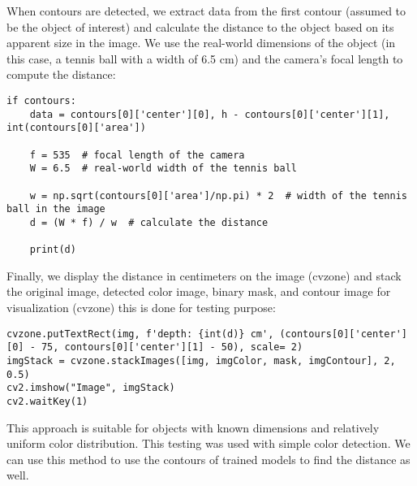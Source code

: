 When contours are detected, we extract data from the first contour (assumed to be the object of interest) and calculate the distance to the object based on its apparent size in the image. We use the real-world dimensions of the object (in this case, a tennis ball with a width of 6.5 cm) and the camera's focal length to compute the distance:

\begin{lstlisting}[language=PythonPlus]
if contours:
    data = contours[0]['center'][0], h - contours[0]['center'][1], int(contours[0]['area'])
    
    f = 535  # focal length of the camera
    W = 6.5  # real-world width of the tennis ball

    w = np.sqrt(contours[0]['area']/np.pi) * 2  # width of the tennis ball in the image
    d = (W * f) / w  # calculate the distance

    print(d)
\end{lstlisting}

Finally, we display the distance in centimeters on the image (cvzone)  and stack the original image, detected color image, binary mask, and contour image for visualization (cvzone) this is done for testing purpose:

\begin{lstlisting}[language=PythonPlus]
cvzone.putTextRect(img, f'depth: {int(d)} cm', (contours[0]['center'][0] - 75, contours[0]['center'][1] - 50), scale= 2)
imgStack = cvzone.stackImages([img, imgColor, mask, imgContour], 2, 0.5)
cv2.imshow("Image", imgStack)
cv2.waitKey(1)
\end{lstlisting}

This approach is suitable for objects with known dimensions and relatively uniform color distribution. This testing was used with simple color detection. We can use this method to use the contours of trained models to find the distance as well. 









